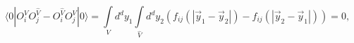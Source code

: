 \begin{equation}
\label{hol4}
    \langle 0| O_i^{V}O_j^{\widehat V}-O_i^{\widehat V}O_j^{V} |0\rangle =
    \int\limits_V\!\! d^d y_1 \int\limits_{\widehat V}\!\!  d^d y_2
    \left(
        f_{ij}\left(|\vec{y}_1-\vec{y}_2|\right)-
        f_{ij}\left(|\vec{y}_2-\vec{y}_1|\right)
    \right)=0,
\end{equation}

